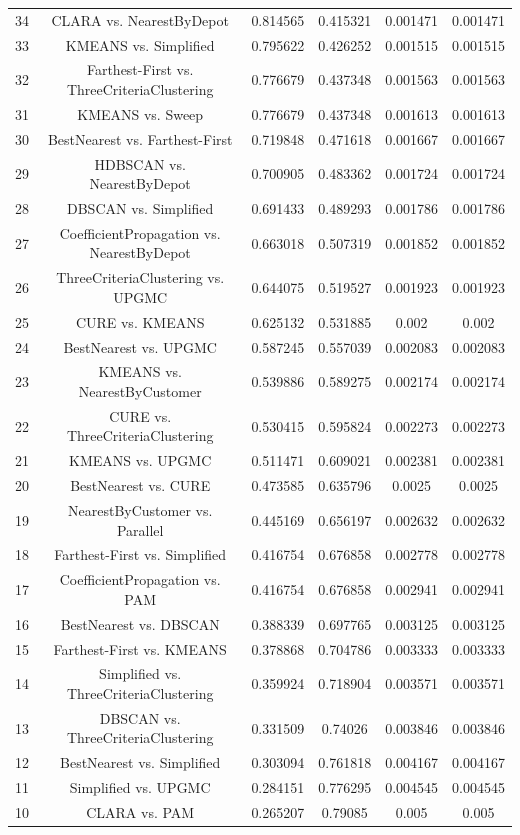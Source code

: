 \documentclass[a4paper,10pt]{article}
\begin{document}
\begin{landscape}
\begin{table}[!htp]
\begin{tabular}{cccccc}
34&CLARA vs. NearestByDepot&0.814565&0.415321&0.001471&0.001471\\
33&KMEANS vs. Simplified&0.795622&0.426252&0.001515&0.001515\\
32&Farthest-First vs. ThreeCriteriaClustering&0.776679&0.437348&0.001563&0.001563\\
31&KMEANS vs. Sweep&0.776679&0.437348&0.001613&0.001613\\
30&BestNearest vs. Farthest-First&0.719848&0.471618&0.001667&0.001667\\
29&HDBSCAN vs. NearestByDepot&0.700905&0.483362&0.001724&0.001724\\
28&DBSCAN vs. Simplified&0.691433&0.489293&0.001786&0.001786\\
27&CoefficientPropagation vs. NearestByDepot&0.663018&0.507319&0.001852&0.001852\\
26&ThreeCriteriaClustering vs. UPGMC&0.644075&0.519527&0.001923&0.001923\\
25&CURE vs. KMEANS&0.625132&0.531885&0.002&0.002\\
24&BestNearest vs. UPGMC&0.587245&0.557039&0.002083&0.002083\\
23&KMEANS vs. NearestByCustomer&0.539886&0.589275&0.002174&0.002174\\
22&CURE vs. ThreeCriteriaClustering&0.530415&0.595824&0.002273&0.002273\\
21&KMEANS vs. UPGMC&0.511471&0.609021&0.002381&0.002381\\
20&BestNearest vs. CURE&0.473585&0.635796&0.0025&0.0025\\
19&NearestByCustomer vs. Parallel&0.445169&0.656197&0.002632&0.002632\\
18&Farthest-First vs. Simplified&0.416754&0.676858&0.002778&0.002778\\
17&CoefficientPropagation vs. PAM&0.416754&0.676858&0.002941&0.002941\\
16&BestNearest vs. DBSCAN&0.388339&0.697765&0.003125&0.003125\\
15&Farthest-First vs. KMEANS&0.378868&0.704786&0.003333&0.003333\\
14&Simplified vs. ThreeCriteriaClustering&0.359924&0.718904&0.003571&0.003571\\
13&DBSCAN vs. ThreeCriteriaClustering&0.331509&0.74026&0.003846&0.003846\\
12&BestNearest vs. Simplified&0.303094&0.761818&0.004167&0.004167\\
11&Simplified vs. UPGMC&0.284151&0.776295&0.004545&0.004545\\
10&CLARA vs. PAM&0.265207&0.79085&0.005&0.005\\

\end{tabular}
\end{table}
\end{landscape}
\end{document}
